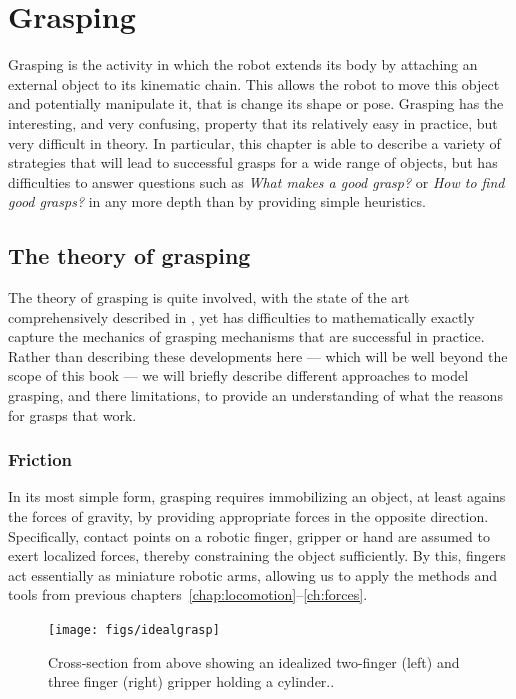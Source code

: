 \chapter{Grasping}
Grasping is the activity in which the robot extends its body by attaching an external object to its kinematic chain. This allows the robot to move this object and potentially manipulate it, that is change its shape or pose. Grasping has the interesting, and very confusing, property that its relatively easy in practice, but very difficult in theory. In particular, this chapter is able to describe a variety of strategies that will lead to successful grasps for a wide range of objects, but has difficulties to answer questions such as \emph{What makes a good grasp?} or \emph{How to find good grasps?} in any more depth than by providing simple heuristics.

\section{The theory of grasping}
The theory of grasping is quite involved, with the state of the art comprehensively described in \cite{rimon2019mechanics}, yet has difficulties to mathematically exactly capture the mechanics of grasping mechanisms that are successful in practice. Rather than describing these developments here --- which will be well beyond the scope of this book --- we will briefly describe different approaches to model grasping, and there limitations, to provide an understanding of what the reasons for grasps that work.

\subsection{Friction}
In its most simple form, grasping requires immobilizing an object, at least agains the forces of gravity, by providing appropriate forces in the opposite direction. Specifically, contact points on a robotic finger, gripper or hand are assumed to exert localized forces, thereby constraining the object sufficiently. By this, fingers act essentially as miniature robotic arms, allowing us to apply the methods and tools from previous chapters~\ref{chap:locomotion}--\ref{ch:forces}.


\begin{figure}
\texttt{[image: figs/idealgrasp]}
\caption{Cross-section from above showing an idealized two-finger (left) and three finger (right) gripper holding a cylinder.\label{fig:idealgrasp}.}
\end{figure}

